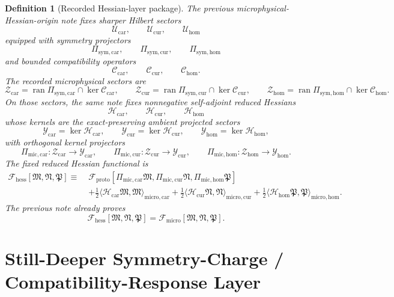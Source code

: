 \documentclass[11pt]{article}
\newcommand{\ProtoFunctional}{\mathscr F_{\mathrm{proto}}}
\newcommand{\UltraFunctional}{\mathscr F_{\mathrm{micro}}}
\newcommand{\RootFunctional}{\mathscr F_{\mathrm{hess}}}
\newcommand{\ProtoTensorClass}{\mathscr Y_{\mathrm{car}}}
\newcommand{\ProtoRelabelClass}{\mathscr Y_{\mathrm{cur}}}
\newcommand{\ProtoFreeClass}{\mathscr Y_{\mathrm{hom}}}
\newcommand{\UltraTensorClass}{\mathscr Z_{\mathrm{car}}}
\newcommand{\UltraRelabelClass}{\mathscr Z_{\mathrm{cur}}}
\newcommand{\UltraFreeClass}{\mathscr Z_{\mathrm{hom}}}
\newcommand{\UltraTensor}{\mathfrak M}
\newcommand{\UltraRelabel}{\mathfrak N}
\newcommand{\UltraFree}{\mathfrak P}
\newcommand{\UltraCarProj}{\Pi_{\mathrm{mic,car}}}
\newcommand{\UltraCurProj}{\Pi_{\mathrm{mic,cur}}}
\newcommand{\UltraHomProj}{\Pi_{\mathrm{mic,hom}}}
\newcommand{\RootTensorClass}{\mathscr U_{\mathrm{car}}}
\newcommand{\RootRelabelClass}{\mathscr U_{\mathrm{cur}}}
\newcommand{\RootFreeClass}{\mathscr U_{\mathrm{hom}}}
\newcommand{\TensorSymProj}{\Pi_{\mathrm{sym,car}}}
\newcommand{\CurSymProj}{\Pi_{\mathrm{sym,cur}}}
\newcommand{\HomSymProj}{\Pi_{\mathrm{sym,hom}}}
\newcommand{\TensorCompat}{\mathcal C_{\mathrm{car}}}
\newcommand{\CurCompat}{\mathcal C_{\mathrm{cur}}}
\newcommand{\HomCompat}{\mathcal C_{\mathrm{hom}}}
\newcommand{\TensorHess}{\mathcal H_{\mathrm{car}}}
\newcommand{\CurHess}{\mathcal H_{\mathrm{cur}}}
\newcommand{\HomHess}{\mathcal H_{\mathrm{hom}}}
\newtheorem{definition}{Definition}
\begin{document}
\begin{definition}[Recorded Hessian-layer package]
\label{def:recorded_hessian}
The previous microphysical-Hessian-origin note fixes sharper Hilbert sectors
\[
\RootTensorClass,\qquad
\RootRelabelClass,\qquad
\RootFreeClass
\]
equipped with symmetry projectors
\[
\TensorSymProj,\qquad
\CurSymProj,\qquad
\HomSymProj
\]
and bounded compatibility operators
\[
\TensorCompat,\qquad
\CurCompat,\qquad
\HomCompat.
\]
The recorded microphysical sectors are
\begin{equation}
\UltraTensorClass=\operatorname{ran}\TensorSymProj\cap\ker\TensorCompat,
\qquad
\UltraRelabelClass=\operatorname{ran}\CurSymProj\cap\ker\CurCompat,
\qquad
\UltraFreeClass=\operatorname{ran}\HomSymProj\cap\ker\HomCompat.
\label{eq:ultra_sectors_recorded}
\end{equation}
On those sectors, the same note fixes nonnegative self-adjoint reduced Hessians
\[
\TensorHess,\qquad
\CurHess,\qquad
\HomHess
\]
whose kernels are the exact-preserving ambient projected sectors
\[
\ProtoTensorClass=\ker\TensorHess,
\qquad
\ProtoRelabelClass=\ker\CurHess,
\qquad
\ProtoFreeClass=\ker\HomHess,
\]
with orthogonal kernel projectors
\[
\UltraCarProj:\UltraTensorClass\to\ProtoTensorClass,\qquad
\UltraCurProj:\UltraRelabelClass\to\ProtoRelabelClass,\qquad
\UltraHomProj:\UltraFreeClass\to\ProtoFreeClass.
\]
The fixed reduced Hessian functional is
\begin{equation}
\begin{aligned}
\RootFunctional[\UltraTensor,\UltraRelabel,\UltraFree]
\equiv\;
&\ProtoFunctional[
\UltraCarProj\UltraTensor,\UltraCurProj\UltraRelabel,\UltraHomProj\UltraFree]
\\
&+\frac12\langle \TensorHess\UltraTensor,\UltraTensor\rangle_{\mathrm{micro,car}}
+\frac12\langle \CurHess\UltraRelabel,\UltraRelabel\rangle_{\mathrm{micro,cur}}
+\frac12\langle \HomHess\UltraFree,\UltraFree\rangle_{\mathrm{micro,hom}}.
\end{aligned}
\label{eq:Froot_recorded}
\end{equation}
The previous note already proves
\begin{equation}
\RootFunctional[\UltraTensor,\UltraRelabel,\UltraFree]
=
\UltraFunctional[\UltraTensor,\UltraRelabel,\UltraFree].
\label{eq:Froot_equals_Fultra_recorded}
\end{equation}
\end{definition}

\section{Still-Deeper Symmetry-Charge / Compatibility-Response Layer}
\end{document}
